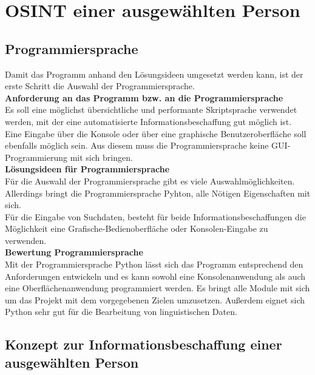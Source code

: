 
\chapter{OSINT einer ausgewählten Person}  %
\label{cha:Informationsbeschaffung einer ausgewählten Person} %

\section{Programmiersprache}
Damit das Programm anhand den Lösungsideen umgesetzt werden kann, ist der erste Schritt die Auswahl der Programmiersprache.\\
\textbf{Anforderung an das Programm bzw. an die Programmiersprache}\\
	Es soll eine möglichst übersichtliche und performante Skriptsprache verwendet werden, mit der eine automatisierte Informationsbeschaffung gut möglich ist. Eine Eingabe über die Konsole oder über eine graphische Benutzeroberfläche soll ebenfalls möglich sein. Aus diesem muss die Programmiersprache keine GUI-Programmierung mit sich bringen.\\
\textbf{Lösungsideen für Programmiersprache}\\
	Für die Auswahl der Programmiersprache gibt es viele Auswahlmöglichkeiten. Allerdings bringt die Programmiersprache Pyhton, alle Nötigen Eigenschaften mit sich.\\
	Für die Eingabe von Suchdaten, besteht für beide Informationsbeschaffungen die Möglichkeit eine Grafische-Bedienoberfläche oder Konsolen-Eingabe zu verwenden.\\
\textbf{Bewertung Programmiersprache}\\
	Mit der Programmiersprache Python lässt sich das Programm entsprechend den Anforderungen entwickeln und es kann sowohl eine Konsolenanwendung als auch eine Oberflächenanwendung programmiert werden. Es bringt alle Module mit sich um das Projekt mit dem vorgegebenen Zielen umzusetzen. Außerdem eignet sich Python sehr gut für die Bearbeitung von linguistischen Daten. \cite{bird2009natural}

\section{Konzept zur Informationsbeschaffung einer ausgewählten Person}	
